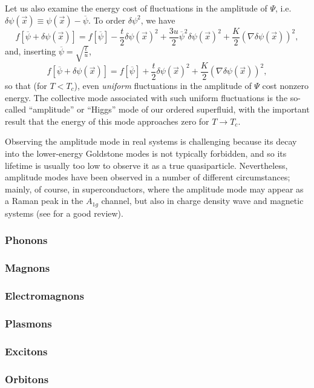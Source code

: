 Let us also examine the energy cost of fluctuations in the amplitude of $\Psi$, i.e. $\delta \psi(\vec{x}) \equiv \psi(\vec{x})-\overline{\psi}$.
To order $\delta \psi^2$, we have
\begin{equation}
f[\overline{\psi}+\delta\psi(\vec{x})] = f[\overline{\psi}]-\frac{t}{2}\delta\psi(\vec{x})^2+\frac{3u}{2}\overline{\psi}^2\delta\psi(\vec{x})^2+\frac{K}{2}(\nabla \delta \psi(\vec{x}))^2,
\end{equation}
and, inserting $\overline{\psi} = \sqrt{\frac{t}{u}}$,
\begin{equation}
f[\overline{\psi}+\delta\psi(\vec{x})] = f[\overline{\psi}]+\frac{t}{2}\delta\psi(\vec{x})^2+\frac{K}{2}(\nabla \delta \psi(\vec{x}))^2,
\end{equation}
so that (for $T<T_c$), even \emph{uniform} fluctuations in the amplitude of $\Psi$ cost nonzero energy.
The collective mode associated with such uniform fluctuations is the so-called ``amplitude'' or ``Higgs'' mode of our ordered superfluid, with the important result that the energy of this mode approaches zero for $T\rightarrow T_c$.

Observing the amplitude mode in real systems is challenging because its decay into the lower-energy Goldstone modes is not typically forbidden, and so its lifetime is usually too low to observe it as a true quasiparticle\cite{jain_higgs_2017}.
Nevertheless, amplitude modes have been observed in a number of different circumstances; mainly, of course, in superconductors, where the amplitude mode may appear as a Raman peak in the $A_{1g}$ channel\citep{measson_amplitude_2014}, but also in charge density wave\citep{wang_axial_2022} and magnetic\citep{hong_higgs_2017,jain_higgs_2017} systems (see \citet{pekker_amplitude_2015} for a good review).

\subsubsection{Phonons}
\subsubsection{Magnons}
\subsubsection{Electromagnons}
\subsubsection{Plasmons}
\subsubsection{Excitons}
\subsubsection{Orbitons}
